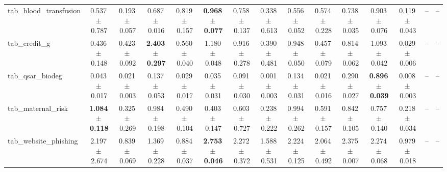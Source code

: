 \documentclass[8pt]{extarticle}
\begin{document}
\begin{longtable}{l*{14}{c}}
tab\_blood\_transfusion & 0.537\,$\pm$\,0.787 & 0.193\,$\pm$\,0.057 & 0.687\,$\pm$\,0.016 & 0.819\,$\pm$\,0.157 & \textbf{0.968\,$\pm$\,0.077} & 0.758\,$\pm$\,0.137 & 0.338\,$\pm$\,0.613 & 0.556\,$\pm$\,0.052 & 0.574\,$\pm$\,0.228 & 0.738\,$\pm$\,0.035 & 0.903\,$\pm$\,0.076 & 0.119\,$\pm$\,0.043 & -- & -- \\
tab\_credit\_g & 0.436\,$\pm$\,0.148 & 0.423\,$\pm$\,0.092 & \textbf{2.403\,$\pm$\,0.297} & 0.560\,$\pm$\,0.040 & 1.180\,$\pm$\,0.048 & 0.916\,$\pm$\,0.278 & 0.390\,$\pm$\,0.481 & 0.948\,$\pm$\,0.050 & 0.457\,$\pm$\,0.079 & 0.814\,$\pm$\,0.062 & 1.093\,$\pm$\,0.042 & 0.029\,$\pm$\,0.006 & -- & -- \\
tab\_qsar\_biodeg & 0.043\,$\pm$\,0.017 & 0.021\,$\pm$\,0.003 & 0.137\,$\pm$\,0.053 & 0.029\,$\pm$\,0.017 & 0.035\,$\pm$\,0.031 & 0.091\,$\pm$\,0.030 & 0.001\,$\pm$\,0.003 & 0.134\,$\pm$\,0.031 & 0.021\,$\pm$\,0.016 & 0.290\,$\pm$\,0.027 & \textbf{0.896\,$\pm$\,0.039} & 0.008\,$\pm$\,0.003 & -- & -- \\
tab\_maternal\_risk & \textbf{1.084\,$\pm$\,0.118} & 0.325\,$\pm$\,0.269 & 0.984\,$\pm$\,0.198 & 0.490\,$\pm$\,0.104 & 0.403\,$\pm$\,0.147 & 0.603\,$\pm$\,0.727 & 0.238\,$\pm$\,0.222 & 0.994\,$\pm$\,0.262 & 0.591\,$\pm$\,0.157 & 0.842\,$\pm$\,0.105 & 0.757\,$\pm$\,0.140 & 0.218\,$\pm$\,0.034 & -- & -- \\
tab\_website\_phishing & 2.197\,$\pm$\,2.674 & 0.839\,$\pm$\,0.069 & 1.369\,$\pm$\,0.228 & 0.884\,$\pm$\,0.037 & \textbf{2.753\,$\pm$\,0.046} & 2.272\,$\pm$\,0.372 & 1.588\,$\pm$\,0.531 & 2.224\,$\pm$\,0.125 & 2.064\,$\pm$\,0.492 & 2.375\,$\pm$\,0.007 & 2.274\,$\pm$\,0.068 & 0.979\,$\pm$\,0.018 & -- & -- \\
\end{longtable}
\end{document}
